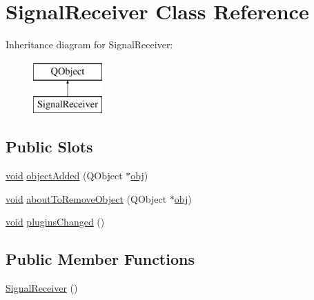 \hypertarget{class_signal_receiver}{\section{Signal\-Receiver Class Reference}
\label{class_signal_receiver}
}
Inheritance diagram for Signal\-Receiver\-:\begin{figure}[H]
\begin{center}
\leavevmode
\includegraphics[height=2.000000cm]{class_signal_receiver}
\end{center}
\end{figure}
\subsection*{Public Slots}
\begin{DoxyCompactItemize}
\item 
\hyperlink{group___u_a_v_objects_plugin_ga444cf2ff3f0ecbe028adce838d373f5c}{void} \hyperlink{class_signal_receiver_a26be1efe883adfad954dbd45c2dcbf98}{object\-Added} (Q\-Object $\ast$\hyperlink{glext_8h_a0c0d4701a6c89f4f7f0640715d27ab26}{obj})
\item 
\hyperlink{group___u_a_v_objects_plugin_ga444cf2ff3f0ecbe028adce838d373f5c}{void} \hyperlink{class_signal_receiver_ac98296cb7aa708c66678c80c6437836a}{about\-To\-Remove\-Object} (Q\-Object $\ast$\hyperlink{glext_8h_a0c0d4701a6c89f4f7f0640715d27ab26}{obj})
\item 
\hyperlink{group___u_a_v_objects_plugin_ga444cf2ff3f0ecbe028adce838d373f5c}{void} \hyperlink{class_signal_receiver_a5d908f3ffab5986fa3a676641c68d69b}{plugins\-Changed} ()
\end{DoxyCompactItemize}
\subsection*{Public Member Functions}
\begin{DoxyCompactItemize}
\item 
\hyperlink{class_signal_receiver_aa20a1f07b5b88219a40bf0de55df209b}{Signal\-Receiver} ()
\end{DoxyCompactItemize}
